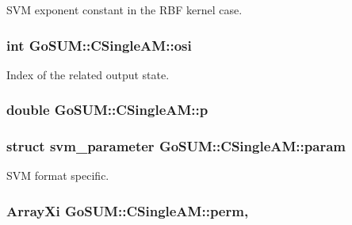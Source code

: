 S\-V\-M exponent constant in the R\-B\-F kernel case. 

\hypertarget{class_go_s_u_m_1_1_c_single_a_m_a55a31b8751445b942790f395f89a00ea}{
\subsubsection[{osi}]{\setlength{\rightskip}{0pt plus 5cm}int Go\-S\-U\-M\-::\-C\-Single\-A\-M\-::osi\hspace{0.3cm}{\ttfamily [protected]}}}\label{class_go_s_u_m_1_1_c_single_a_m_a55a31b8751445b942790f395f89a00ea}


Index of the related output state. 

\hypertarget{class_go_s_u_m_1_1_c_single_a_m_a2151ace8d1a5b99355bbf1ee8db0278c}{
\subsubsection[{p}]{\setlength{\rightskip}{0pt plus 5cm}double Go\-S\-U\-M\-::\-C\-Single\-A\-M\-::p\hspace{0.3cm}{\ttfamily [protected]}}}\label{class_go_s_u_m_1_1_c_single_a_m_a2151ace8d1a5b99355bbf1ee8db0278c}
\hypertarget{class_go_s_u_m_1_1_c_single_a_m_a3ef521484ddcef46a6a1da104fb0bf87}{
\subsubsection[{param}]{\setlength{\rightskip}{0pt plus 5cm}struct svm\-\_\-parameter Go\-S\-U\-M\-::\-C\-Single\-A\-M\-::param\hspace{0.3cm}{\ttfamily [protected]}}}\label{class_go_s_u_m_1_1_c_single_a_m_a3ef521484ddcef46a6a1da104fb0bf87}


S\-V\-M format specific. 

\hypertarget{class_go_s_u_m_1_1_c_single_a_m_a920cc0a3474605d576acde4639e37487}{
\subsubsection[{perm}]{\setlength{\rightskip}{0pt plus 5cm}Array\-Xi Go\-S\-U\-M\-::\-C\-Single\-A\-M\-::perm\hspace{0.3cm}{\ttfamily [static]}, {\ttfamily [protected]}}}\label{class_go_s_u_m_1_1_c_single_a_m_a920cc0a3474605d576acde4639e37487}


